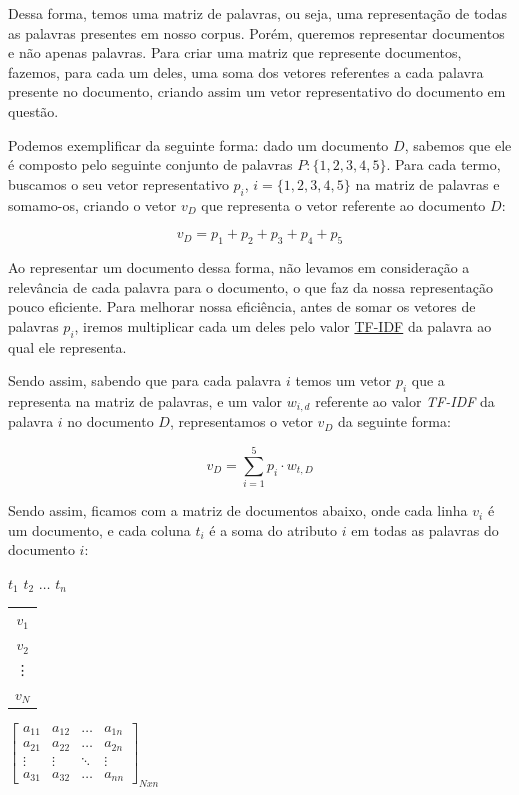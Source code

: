 \documentclass[a4paper,12pt]{article}
\begin{document}
Dessa forma, temos uma matriz de palavras, ou seja, uma representação de todas as palavras presentes em nosso corpus.
Porém, queremos representar documentos e não apenas palavras.
Para criar uma matriz que represente documentos, fazemos, para cada um deles, uma soma dos vetores referentes a cada palavra presente
no documento, criando assim um vetor representativo do documento em questão.

Podemos exemplificar da seguinte forma: dado um documento $D$, sabemos que ele é composto pelo seguinte conjunto de palavras
$P:\{1,2,3,4,5\}$. Para cada termo, buscamos o seu vetor representativo $p_{i}$, $i =\{1,2,3,4,5\}$ na matriz de
palavras e somamo-os, criando o vetor $v_{D}$ que representa o vetor referente ao documento $D$:

\begin{equation}
  v_{D} = p_{1}+p_{2}+p_{3}+p_{4}+p_{5}
\end{equation}


Ao representar um documento dessa forma, não levamos em consideração a relevância de cada palavra para o documento, o que
faz da nossa representação pouco eficiente. Para melhorar nossa 
eficiência, antes de somar os vetores de palavras $p_{i}$, iremos multiplicar cada um deles pelo valor \hyperref[sec:nlp]{TF-IDF} da palavra
ao qual ele representa.

Sendo assim, sabendo que para cada palavra $i$ temos um vetor $p_{i}$ que a representa na matriz de palavras, e um valor $w_{i,d}$ referente
ao valor \textit{TF-IDF} da palavra $i$ no documento $D$, representamos o vetor $v_{D}$ da seguinte forma:

\begin{equation}
  v_{D} = \sum_{i=1}^{5} p_{i} \cdot w_{t,D}
\end{equation}


Sendo assim, ficamos com a matriz de documentos abaixo, onde cada linha $v_{i}$ é um documento, e cada coluna $t_{i}$ é a soma do atributo $i$
em todas as palavras do documento $i$:

 \begin{center}
 \hspace{0.2cm}$t_{1}$ \hspace{0.5cm} $t_{2}$ \hspace{0.3cm} $\hdots$ \hspace{0.4cm}$t_{n}$
 
 \vspace{0.2cm}
 
\begin{tabular}{c}
   $v_{1}$ \\
   $v_{2}$ \\
   \vdots\\
   $v_{N}$
 \end{tabular}
 $
 \begin{bmatrix}
  a_{11} & a_{12} & \hdots & a_{1n}\\
  a_{21} & a_{22} & \hdots & a_{2n}\\
  \vdots & \vdots & \ddots & \vdots\\
  a_{31} & a_{32} & \hdots & a_{nn}
 \end{bmatrix}_{Nxn}
$

\end{center}
\end{document}
